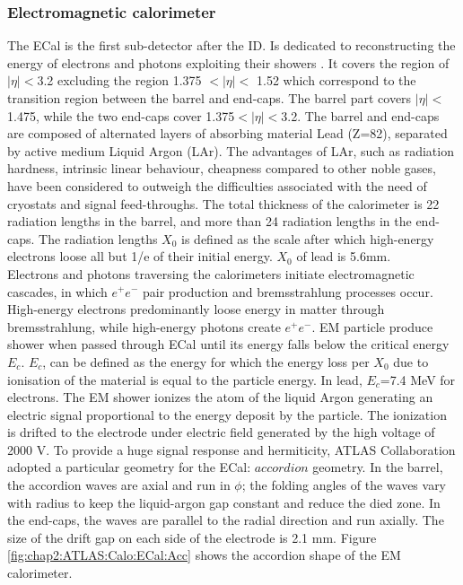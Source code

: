 \subsubsection{Electromagnetic calorimeter}
\label{chap2:ATLAS:Calo:ECAL}
The ECal is the first sub-detector after the ID. Is dedicated to reconstructing the energy of electrons and photons exploiting their showers \cite{LAr_TRD}. It covers the region of $|\eta|<$3.2 excluding the region 1.375 $<|\eta|<$ 1.52 which correspond to the transition region between the barrel and end-caps. The barrel part covers $|\eta|<$1.475, while the two end-caps cover 1.375$<|\eta|<$3.2. The barrel and end-caps are composed of alternated layers of absorbing material Lead (Z=82), separated by active medium Liquid Argon (LAr). The advantages of LAr, such as radiation hardness, intrinsic linear behaviour, cheapness compared to other noble gases, have been considered to outweigh the difficulties associated with the need of cryostats and signal feed-throughs. The total thickness of the calorimeter is 22 radiation lengths in the barrel, and more than 24 radiation lengths in the end-caps. The radiation lengths $X_0$ is defined as the scale after which high-energy electrons loose all but 1/e of their initial energy. $X_0$ of lead is 5.6mm. \\
Electrons and photons traversing the calorimeters initiate electromagnetic cascades, in which $e^+e^-$ pair production and bremsstrahlung processes occur. High-energy electrons predominantly loose energy in matter through bremsstrahlung, while high-energy photons create $e^+e^-$. EM particle produce shower when passed through ECal until its energy falls below the critical energy $E_c$. $E_c$, can be defined as the energy for which the energy loss per $X_0$ due to ionisation of the material is equal to the particle energy. In lead, $E_c$=7.4 MeV for electrons. The EM shower ionizes the atom of the liquid Argon generating an electric signal proportional to the energy deposit by the particle. The ionization is drifted to the electrode under electric field generated by the high voltage of 2000 V. To provide a huge signal response and hermiticity, ATLAS Collaboration adopted a particular geometry for the ECal: $accordion$ geometry. In the barrel, the accordion waves are axial and run in $\phi$; the folding angles of the waves vary with radius to keep the liquid-argon gap constant and reduce the died zone. In the end-caps, the waves are parallel to the radial direction and run axially. The size of the drift gap on each side of the electrode is 2.1 mm. Figure \ref{fig:chap2:ATLAS:Calo:ECal:Acc} shows the accordion shape of the EM calorimeter.
